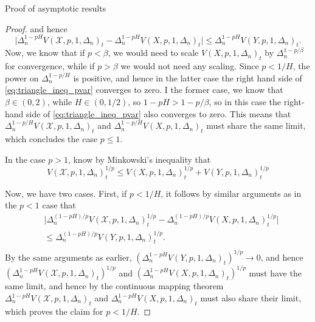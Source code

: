 \documentclass[fleqn,11pt,letterpaper]{article}
\theoremstyle{plain}
\theoremstyle{definition}
\theoremstyle{remark}
\numberwithin{equation}{section}
\begin{document}
\begin{section}{Proof of asymptotic results}
\begin{proof}
    and hence 
    \begin{equation}\label{eq:triangle_ineq_pvar}
        \vert \Delta_n^{1-pH}V(\mathcal{X},p,1,\Delta_n)_t - \Delta_n^{1-pH}V(X,p,1,\Delta_n)_t\vert\leq \Delta_n^{1-pH}V(Y,p,1,\Delta_n)_t.
    \end{equation}    
    Now, we know that if $p<\beta$, we would need to scale $V(X,p,1,\Delta_n)_t$ by $\Delta_n^{1-p/\beta}$ for convergence, while if $p>\beta$ we would not need any scaling. Since $p<1/H$, the power on $\Delta_n^{1-p/H}$ is positive, and hence in the latter case the right hand side of \eqref{eq:triangle_ineq_pvar} converges to zero. I the former case, we know that $\beta\in(0,2)$, while $H\in(0,1/2)$, so $1-pH>1-p/\beta$, so in this case the right-hand side of \eqref{eq:triangle_ineq_pvar} also converges to zero. This means that $\Delta_n^{1-p/H}V(\mathcal{X},p,1,\Delta_n)_t$ and $\Delta_n^{1-p/H}V(X,p,1,\Delta_n)_t$ must share the same limit, which concludes the case $p\leq1$.

    In the case $p>1$, know by Minkowski's inequality that 
    \begin{equation}
            V(\mathcal{X},p,1,\Delta_n)^{1/p}_t\leq V(X,p,1,\Delta_n)^{1/p}_t + V(Y,p,1,\Delta_n)^{1/p}_t
    \end{equation}

    Now, we have two cases. First, if $p<1/H$, it follows by similar arguments as in the $p<1$ case that 
    \begin{equation}
        \begin{split}
                &\vert \Delta_n^{(1-pH)/p}V(\mathcal{X},p,1,\Delta_n)^{1/p}_t - \Delta_n^{(1-pH)/p}V(X,p,1,\Delta_n)^{1/p}_t\vert\\&\leq \Delta_n^{(1-pH)/p}V(Y,p,1,\Delta_n)^{1/p}_t.\\
        \end{split}
    \end{equation}     
    By the same arguments as earlier, $\left(\Delta_n^{1-pH}V(Y,p,1,\Delta_n)_t\right)^{1/p}\to0$, and hence $\left(\Delta_n^{1-pH}V(\mathcal{X},p,1,\Delta_n)_t\right)^{1/p}$ and $\left(\Delta_n^{1-pH}V(X,p,1,\Delta_n)_t\right)^{1/p}$ must have the same limit, and hence by the continuous mapping theorem $\Delta_n^{1-pH}V(\mathcal{X},p,1,\Delta_n)_t$ and $\Delta_n^{1-pH}V(X,p,1,\Delta_n)_t$ must also share their limit, which proves the claim for $p<1/H$.


\end{proof}
\end{section}
\end{document}
